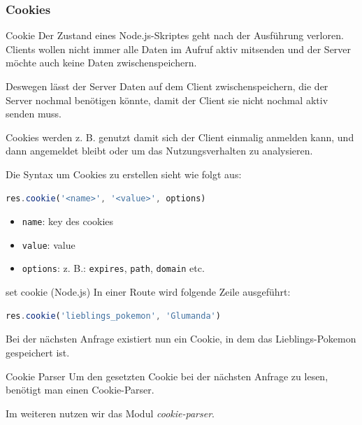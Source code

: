 \subsubsection{Cookies}

\begin{defi}{Cookie}
    Der Zustand eines Node.js-Skriptes geht nach der Ausführung verloren.
    Clients wollen nicht immer alle Daten im Aufruf aktiv mitsenden und der Server möchte auch keine Daten zwischenspeichern.

    Deswegen lässt der Server Daten auf dem Client zwischenspeichern, die der Server nochmal benötigen könnte, damit der Client sie nicht nochmal aktiv senden muss.

    Cookies werden z. B. genutzt damit sich der Client einmalig anmelden kann, und dann angemeldet bleibt oder um das Nutzungsverhalten zu analysieren.

    Die Syntax um Cookies zu erstellen sieht wie folgt aus:
    \begin{lstlisting}[language=JavaScript]
        res.cookie('<name>', '<value>', options)
    \end{lstlisting}

    \begin{itemize}
        \item \texttt{name}: key des cookies
        \item \texttt{value}: value
        \item \texttt{options}: z. B.: \texttt{expires}, \texttt{path}, \texttt{domain} etc.
    \end{itemize}
\end{defi}

\begin{example}{set cookie (Node.js)}
    In einer Route wird folgende Zeile ausgeführt:

    \begin{lstlisting}[language=JavaScript]
        res.cookie('lieblings_pokemon', 'Glumanda')
    \end{lstlisting}

    Bei der nächsten Anfrage existiert nun ein Cookie, in dem das Lieblings-Pokemon gespeichert ist.
\end{example}

\begin{bonus}{Cookie Parser}
    Um den gesetzten Cookie bei der nächsten Anfrage zu lesen, benötigt man einen Cookie-Parser.

    Im weiteren nutzen wir das Modul \emph{cookie-parser}.
\end{bonus}

